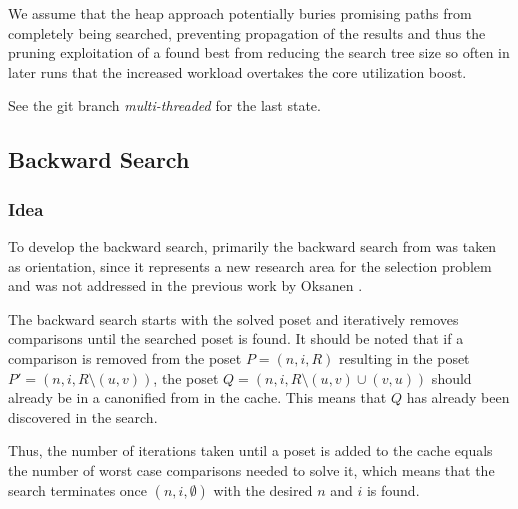 \documentclass[10pt,journal,compsoc]{IEEEtran}
\begin{document}
We assume that the heap approach potentially buries promising paths from completely being searched, preventing propagation of the results and thus the pruning exploitation of a found best from reducing the search tree size so often in later runs that the increased workload overtakes the core utilization boost.

See the git branch \textit{multi-threaded} for the last state.

\subsection{Backward Search} \label{sec:backward}

\subsubsection{Idea}

To develop the backward search, primarily the backward search from \cite{stober2022lower} was taken as orientation, since it represents a new research area for the selection problem and was not addressed in the previous work by Oksanen \cite{Oksanen}.

The backward search starts with the solved poset and iteratively removes comparisons until the searched poset is found.
It should be noted that if a comparison is removed from the poset $P = (n, i, R)$ resulting in the poset $P' = (n, i, R \setminus (u, v))$,
the poset $Q = (n, i, R \setminus (u, v) \cup (v, u))$ should already be in a canonified from in the cache.
This means that $Q$ has already been discovered in the search.

Thus, the number of iterations taken until a poset is added to the cache equals the number of worst case comparisons needed to solve it, which means that the search terminates once $(n, i, \emptyset)$ with the desired $n$ and $i$ is found.

\end{document}
